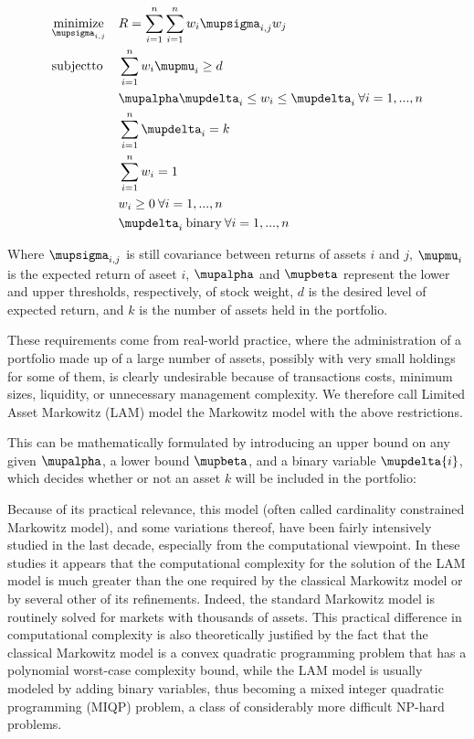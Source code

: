 \documentclass[11pt, a4paper]{awesome-cv}
\begin{document}
\begin{cvletter}
\begin{equation*}
\begin{aligned}
& \underset{\mupsigma_{i,j}}{\text{minimize}}
& & R = \sum_{i=1}^{n} \sum_{i=1}^{n} w_{i} \mupsigma_{i,j} w_{j} \\
& \mathrm{subject to}
& & \sum_{i=1}^{n} w_{i}\mupmu_{i} \geq d \\
&&& \mupalpha\mupdelta_{i} \leq w_{i} \leq \mupdelta_{i} \: \forall i = 1,...,n \\
&&& \sum_{i=1}^{n} \mupdelta_{i}  = k \\
&&& \sum_{i=1}^{n} w_{i}  = 1 \\
&&& w_{i} \geq 0 \: \forall i = 1,...,n \\
&&& \mupdelta_{i}   \: \text{binary} \: \forall i = 1,...,n \\
\end{aligned}
\end{equation*}

Where \(\mupsigma_{i,j}\) is still covariance between returns of assets \(i\) and \(j\),
\(\mupmu_{i}\) is the expected return of aseet \(i\), \(\mupalpha\) and \(\mupbeta\) represent
the lower and upper thresholds, respectively, of stock weight, \(d\) is the
desired level of expected return, and \(k\) is the number of assets held in the
portfolio.



These requirements come from real-world practice, where the administration of a portfolio made up of a large number of assets, possibly with very small holdings for some of them, is clearly undesirable because of transactions costs, minimum sizes, liquidity, or unnecessary management complexity. We therefore call Limited Asset Markowitz (LAM) model the Markowitz model with the above restrictions.

This can be mathematically formulated by introducing an upper bound on any given \(\mupalpha\), a lower bound \(\mupbeta\), and a binary variable \(\mupdelta{i}\), which decides whether or not an asset \(k\) will be included in the portfolio:


Because of its practical relevance, this model (often called cardinality constrained Markowitz model), and some variations thereof, have been fairly intensively studied in the last decade, especially from the computational viewpoint. In these studies it appears that the computational complexity for the solution of the LAM model is much greater than the one required by the classical Markowitz model or by several other of its refinements. Indeed, the standard Markowitz model is routinely solved for markets with thousands of assets. This practical difference in computational complexity is also theoretically justified by the fact that the classical Markowitz model is a convex quadratic programming problem that has a polynomial worst-case complexity bound, while the LAM model is usually modeled by adding binary variables, thus becoming a mixed integer quadratic programming (MIQP) problem, a class of considerably more difficult NP-hard problems.


\end{cvletter}
\end{document}
